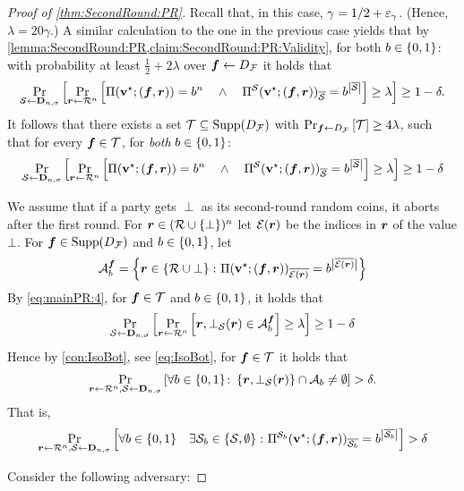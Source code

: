 \begin{proof}[Proof of \cref{thm:SecondRound:PR}]
Recall that, in this case, $\gamma=1/2+\eps_\gamma$. (Hence, $\lambda=20\gamma$.)
A similar calculation to the one in the previous case
yields that by \cref{lemma:SecondRound:PR,claim:SecondRound:PR:Validity}, for both $\o\in \zo$: with probability at least $\frac12 + 2\lambda$ over $\vf \gets \DF $ it holds that
\begin{align*}
\ppr{\cs \gets \bns}{\ppr{\vr \gets \rn}{\Pi(\vstar;(\vf,\vr)) = \o^n \qand \Pi^\cs(\vstar;(\vf,\vr))_\oS = \o^{\size{\oS}} } \ge \lambda}\ge 1-\delta.
\end{align*}
It follows that there exists a set $\cT \subseteq \SDF$ with $\ppr{\vf \gets \DF}{\cT}\ge 4\lambda$, such that for every $\vf\in \cT$, for \emph{both} $\o\in \zo$:
\begin{align}\label{eq:mainPR:4}
\ppr{\cs \gets \bns}{\ppr{\vr \gets \rn}{\Pi(\vstar;(\vf,\vr)) = \o^n \qand \Pi^\cs(\vstar;(\vf,\vr))_\oS = \o^{\size{\oS}} } \ge \lambda}\ge 1-\delta
\end{align}

We assume \wlg that if a party gets $\perp$ as its second-round random coins, it aborts after the first round. For $\vr \in (\cR\cup\sset{\bot})^n$ let $ \cE(\vr)$ be the indices in $\vr$ of the value $\bot$.
For $\vf \in \SDF$ and $\o \in \zo$, let
\begin{align}
\cA^\vf_\o = \set{\vr \in \rbot \colon \Pi(\vstar;(\vf,\vr))_{\overline{\cE(\vr)}} = \o^{\size{\overline{\cE(\vr)}}}}
\end{align}
By \cref{eq:mainPR:4}, for $\vf \in \cT$ and $\o\in \zo$, it holds that
\begin{align}
\ppr{\cs\gets \bns}{\ppr{\vr \gets \rn}{\vr,\bot_{\cS}(\vr) \in \cA^\vf_\o} \ge\lambda} \ge 1-\delta
\end{align}
Hence by \cref{con:IsoBot}, see \cref{eq:IsoBot}, for $\vf \in \cT$ it holds that
\begin{align*}
\ppr{\vr\gets \rn,\cS \gets \bns}{\forall \o \in \zo\colon \set{\vr,\bot_{\cS}(\vr)}\cap \cA_b \neq \emptyset} > \delta.
\end{align*}
That is,
\begin{align}\label{eq:PR:3}
\ppr{\vr\gets \cR^n,\cS \gets \bns}{\forall \o\in \zo \quad \exists \cs_\o \in \set{\cs,\emptyset} \colon \Pi^{\cS_\o}(\vstar;(\vf,\vr))_{\overline{\cS_\o}}= \o^{ \size{\overline{\cS_\o}}}} >\delta
\end{align}

{\samepage
\noindent
Consider the following adversary:

}
\end{proof}
